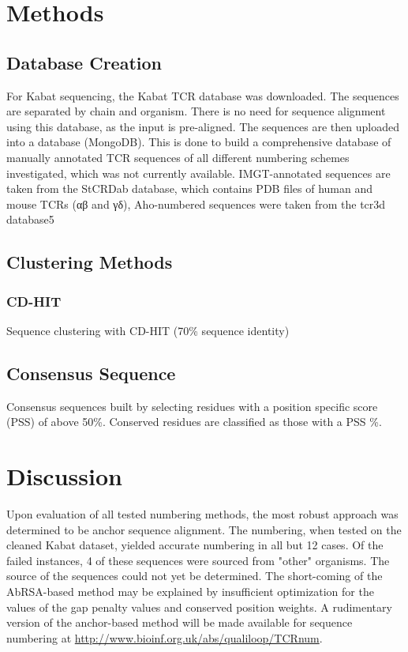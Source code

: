 \section{Methods}

\subsection{Database Creation}
For Kabat sequencing, the Kabat TCR database was downloaded. The sequences are separated by chain and organism. There is no need for sequence alignment using this database, as the input is pre-aligned. The sequences are then uploaded into a database (MongoDB). This is done to build a comprehensive database of manually annotated TCR sequences of all different numbering schemes investigated, which was not currently available. IMGT-annotated sequences are taken from the StCRDab\cite{Leem2018} database, which contains PDB files of human and mouse TCRs (αβ and γδ), Aho-numbered sequences were taken from the tcr3d database5\cite{Gowthaman2019} 

\subsection{Clustering Methods}
\subsubsection{CD-HIT}
Sequence clustering with CD-HIT\cite{Li2006} (70\% sequence identity)

\subsection{Consensus Sequence}
 Consensus sequences built by selecting residues with a position specific score (PSS) of above 50\%. Conserved residues are classified as those with a PSS \%.
 

\section{Discussion}

Upon evaluation of all tested numbering methods, the most robust approach was determined to be anchor sequence alignment. The numbering, when tested on the cleaned Kabat dataset, yielded accurate numbering in all but 12 cases. Of the failed instances, 4 of these sequences were sourced from "other" organisms. The source of the sequences could not yet be determined. 
The short-coming of the AbRSA-based method may be explained by insufficient optimization for the values of the gap penalty values and conserved position weights. 
A rudimentary version of the anchor-based method will be made available for sequence numbering at  \url{http://www.bioinf.org.uk/abs/qualiloop/TCRnum}. 


